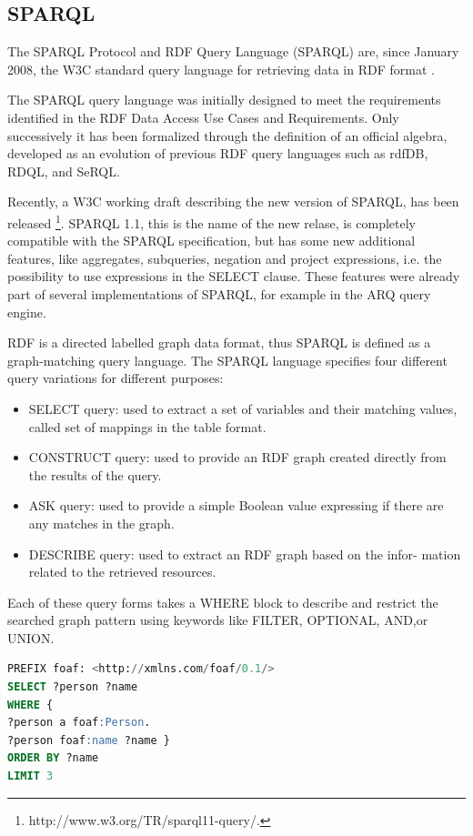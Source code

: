 \subsection{SPARQL}\label{sec:sparql}


The SPARQL Protocol and RDF Query Language (SPARQL) are, since January 2008, the W3C standard query language for retrieving data in RDF format \cite{prudhommeaux_sparql_2008}.

The SPARQL query language was initially designed to meet the requirements identified in the RDF Data Access Use Cases and Requirements. Only successively it has been formalized through the definition of an official algebra, developed as an evolution of previous RDF query languages such as rdfDB, RDQL, and SeRQL.

Recently, a W3C working draft describing the new version of SPARQL, has been released \footnote{http://www.w3.org/TR/sparql11-query/.}. SPARQL 1.1, this is the name of the new relase, is completely compatible with the SPARQL specification, but has some new additional features, like aggregates, subqueries, negation and project expressions, i.e. the possibility to use expressions in the SELECT clause. These features were already part of several implementations of SPARQL, for example in the ARQ query engine. 

RDF is a directed labelled graph data format, thus SPARQL is defined as a graph-matching query language. The SPARQL language specifies four different query variations for different purposes:
\begin{itemize}
\item SELECT query: used to extract a set of variables and their matching values, called set of mappings in the table format.
\item CONSTRUCT query: used to provide an RDF graph created directly from the results of the query.
\item ASK query: used to provide a simple Boolean value expressing if there are any matches in the graph.
\item DESCRIBE query: used to extract an RDF graph based on the infor- mation related to the retrieved resources.
\end{itemize}

Each of these query forms takes a WHERE block to describe and restrict the searched graph pattern using keywords like FILTER, OPTIONAL, AND,or UNION.

\begin{lstlisting}[language=SQL, caption=An example of a simple SPARQL query , keywords={PREFIX,SELECT,WHERE,ORDER,BY, LIMIT }, label=code:sparql]
PREFIX foaf: <http://xmlns.com/foaf/0.1/> 
SELECT ?person ?name
WHERE {
?person a foaf:Person.
?person foaf:name ?name }
ORDER BY ?name 
LIMIT 3
\end{lstlisting}

